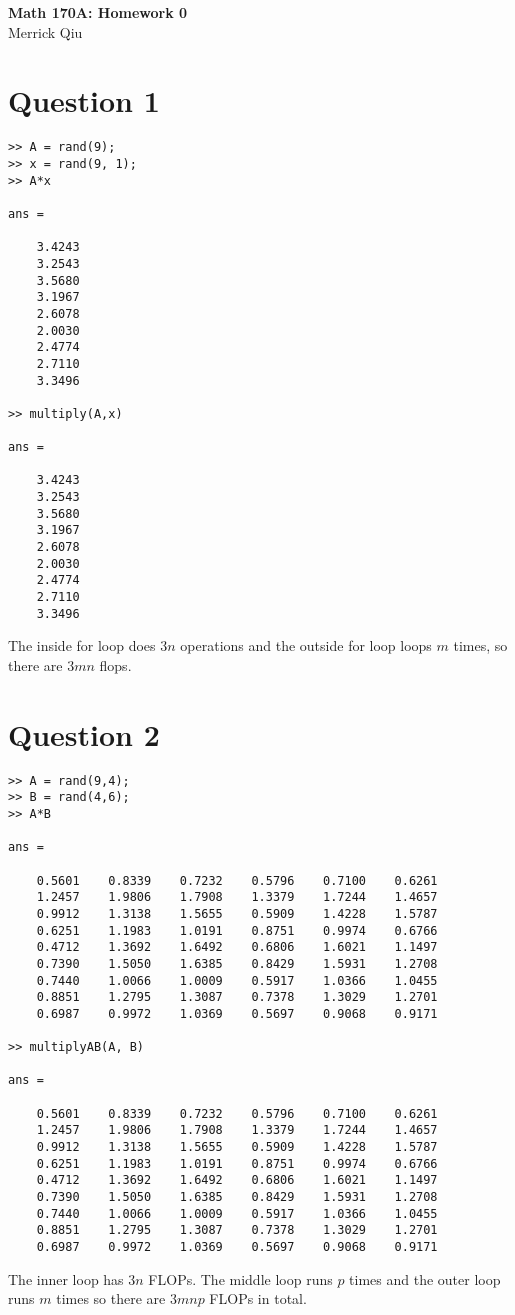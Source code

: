\documentclass{article}
\begin{document}
\begin{center}
	\huge{\bf Math 170A: Homework 0} \\
	Merrick Qiu
\end{center}

\section*{Question 1}



        
\begin{verbatim}
>> A = rand(9);
>> x = rand(9, 1);
>> A*x

ans =

    3.4243
    3.2543
    3.5680
    3.1967
    2.6078
    2.0030
    2.4774
    2.7110
    3.3496

>> multiply(A,x)

ans =

    3.4243
    3.2543
    3.5680
    3.1967
    2.6078
    2.0030
    2.4774
    2.7110
    3.3496
\end{verbatim}
The inside for loop does $3n$ operations and 
the outside for loop loops $m$ times, so there are $3mn$ flops.
\newpage

\section*{Question 2}


\begin{verbatim}
>> A = rand(9,4);
>> B = rand(4,6);
>> A*B

ans =

    0.5601    0.8339    0.7232    0.5796    0.7100    0.6261
    1.2457    1.9806    1.7908    1.3379    1.7244    1.4657
    0.9912    1.3138    1.5655    0.5909    1.4228    1.5787
    0.6251    1.1983    1.0191    0.8751    0.9974    0.6766
    0.4712    1.3692    1.6492    0.6806    1.6021    1.1497
    0.7390    1.5050    1.6385    0.8429    1.5931    1.2708
    0.7440    1.0066    1.0009    0.5917    1.0366    1.0455
    0.8851    1.2795    1.3087    0.7378    1.3029    1.2701
    0.6987    0.9972    1.0369    0.5697    0.9068    0.9171

>> multiplyAB(A, B)

ans =

    0.5601    0.8339    0.7232    0.5796    0.7100    0.6261
    1.2457    1.9806    1.7908    1.3379    1.7244    1.4657
    0.9912    1.3138    1.5655    0.5909    1.4228    1.5787
    0.6251    1.1983    1.0191    0.8751    0.9974    0.6766
    0.4712    1.3692    1.6492    0.6806    1.6021    1.1497
    0.7390    1.5050    1.6385    0.8429    1.5931    1.2708
    0.7440    1.0066    1.0009    0.5917    1.0366    1.0455
    0.8851    1.2795    1.3087    0.7378    1.3029    1.2701
    0.6987    0.9972    1.0369    0.5697    0.9068    0.9171
\end{verbatim}

The inner loop has $3n$ FLOPs. 
The middle loop runs $p$ times and the outer loop runs $m$ times
so there are $3mnp$ FLOPs in total.
\end{document}
